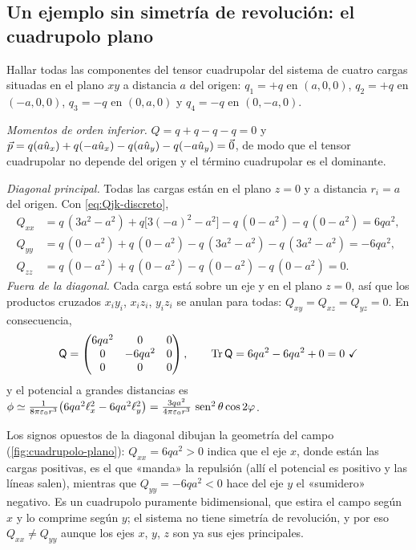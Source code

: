 \subsection{Un ejemplo sin simetría de revolución: el cuadrupolo plano}\label{sec:cuadrupolo-plano}
\begin{ejemplo}\label{ej:cuadrupolo-plano}
Hallar todas las componentes del tensor cuadrupolar del sistema de cuatro cargas situadas en el plano $xy$ a distancia $a$ del origen:
$q_1=+q$ en $(a,0,0)$, $q_2=+q$ en $(-a,0,0)$, $q_3=-q$ en $(0,a,0)$ y $q_4=-q$ en $(0,-a,0)$.

\emph{Momentos de orden inferior.} $Q=q+q-q-q=0$ y $\vec{p}=q(a\hat{u}_{x})+q(-a\hat{u}_{x})-q(a\hat{u}_{y})-q(-a\hat{u}_{y})=\vec{0}$, de modo que el tensor cuadrupolar no depende del origen y el término
cuadrupolar es el dominante.

\emph{Diagonal principal.} Todas las cargas están en el plano $z=0$ y a distancia $r_i=a$ del origen. Con \cref{eq:Qjk-discreto},
\begin{align*}
  Q_{xx}&=q\,(3a^{2}-a^{2})+q\bigl[3(-a)^{2}-a^{2}\bigr]-q\,(0-a^{2})-q\,(0-a^{2})=6qa^{2},\\
  Q_{yy}&=q\,(0-a^{2})+q\,(0-a^{2})-q\,(3a^{2}-a^{2})-q\,(3a^{2}-a^{2})=-6qa^{2},\\
  Q_{zz}&=q\,(0-a^{2})+q\,(0-a^{2})-q\,(0-a^{2})-q\,(0-a^{2})=0 .
\end{align*}
\emph{Fuera de la diagonal.} Cada carga está sobre un eje y en el plano $z=0$, así que los productos cruzados $x_iy_i$, $x_iz_i$, $y_iz_i$ se anulan para todas:
$Q_{xy}=Q_{xz}=Q_{yz}=0$. En consecuencia,
\[
  \mathsf{Q}=\begin{pmatrix}6qa^{2}&0&0\\0&-6qa^{2}&0\\0&0&0\end{pmatrix},\qquad \operatorname{Tr}\mathsf{Q}=6qa^{2}-6qa^{2}+0=0\ \checkmark
\]
y el potencial a grandes distancias es $\phi\simeq\frac{1}{8\pi\varepsilon_{0} r^{3}}\bigl(6qa^{2}\ell_{x}^{2}-6qa^{2}\ell_{y}^{2}\bigr)=\frac{3qa^{2}}{4\pi\varepsilon_{0} r^{3}}\,\operatorname{sen}^{2}\theta\cos2\varphi$.
\end{ejemplo}

\begin{observacion}\label{obs:cuadrupolo-plano}
Los signos opuestos de la diagonal dibujan la geometría del campo (\cref{fig:cuadrupolo-plano}): $Q_{xx}=6qa^{2}>0$ indica que el eje $x$, donde están las cargas
positivas, es el que «manda» la repulsión (allí el potencial es positivo y las líneas salen), mientras que $Q_{yy}=-6qa^{2}<0$ hace del eje $y$ el «sumidero»
negativo. Es un cuadrupolo puramente bidimensional, que estira el campo según $x$ y lo comprime según $y$; el sistema no tiene simetría de revolución, y por eso
$Q_{xx}\neq Q_{yy}$ aunque los ejes $x$, $y$, $z$ son ya sus ejes principales.
\end{observacion}

